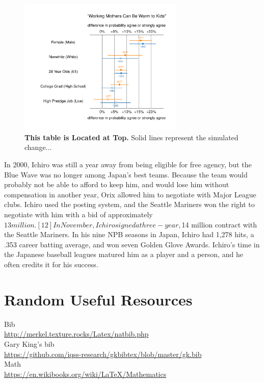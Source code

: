 \documentclass[12pt]{article}
\theoremstyle{hypotheses}
\begin{document}
\begin{figure}[t] %
  \begin{center}
      \includegraphics[width=0.7\textwidth]{plots/mothersFD7789.pdf} 
      \vspace{-2.5em}
      \caption{\textbf{This table is Located at Top.} Solid lines represent the simulated change...}
      \label{fig:TopPlot}
  \end{center}
\end{figure} 

In 2000, Ichiro was still a year away from being eligible for free agency, but the Blue Wave was no longer among Japan's best teams. Because the team would probably not be able to afford to keep him, and would lose him without compensation in another year, Orix allowed him to negotiate with Major League clubs. Ichiro used the posting system, and the Seattle Mariners won the right to negotiate with him with a bid of approximately $13 million.[12] In November, Ichiro signed a three-year, $14 million contract with the Seattle Mariners. In his nine NPB seasons in Japan, Ichiro had 1,278 hits, a .353 career batting average, and won seven Golden Glove Awards. Ichiro's time in the Japanese baseball leagues matured him as a player and a person, and he often credits it for his success.

\section{Random Useful Resources}
Bib \\
\url{http://merkel.texture.rocks/Latex/natbib.php} \\
Gary King's bib\\
\url{https://github.com/iqss-research/gkbibtex/blob/master/gk.bib}\\
Math\\
\url{https://en.wikibooks.org/wiki/LaTeX/Mathematics}\\
\end{document}
